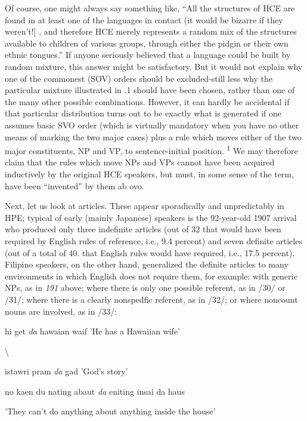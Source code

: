 Of course, one might always say something like, ``All the struc\-tures of HCE are found in at least one of the languages in contact (it would be bizarre if they weren't!] , and therefore HCE merely repre\-sents a random mix of the structures available to children of various groups, through either the pidgin or their own ethnic tongues.'' If anyone seriously believed that a language could be built by random mixture, this answer might be satisfactory. But it would not explain why one of the commonest (SOV) orders should be excluded-still less why the particular mixture illustrated in .1 should have been chosen, rather than one of the many other possible combinations. However, it can hardly be accidental if that particular distribution turns out to be exactly what is generated if one assumes basic SVO order (which is virtually mandatory when you have no other means of mark\-ing the two major cases) plus a rule which moves either of the two major constituents, NP and VP, to sentence-initial position. \textsuperscript{1} We may 
therefore claim that the rules which move NPs and VPs cannot have been acquired inductively by the original HCE speakers, but must, in some sense of the term, have been ``invented'' by them ab ovo.

Next, let us look at articles. These appear sporadically and unpredictably in HPE; typical of early (mainly Japanese) speakers is the 92-year-old 1907 arrival who produced only three indefinite articles (out of 32 that would have been required by English rules of reference, i.e., 9.4 percent) and seven definite articles (out of a total of 40. that English rules would have required, i.e., 17.5 percent). Filipino speakers, on the other hand, generalized the definite articles to many environ\-ments in which English does not require them, for example: with generic NPs, as in \textit{191} above; where there is only one possible refer\-ent, as in /30/ or /31/; where there is a clearly nonspedfic referent, as in /32/; or where noncount nouns are involved, as in /33/:

\ea\label{ex:30}
 hi get \textit{da} hawaian waif 'He has a Hawaiian wife'
\glt
\z

{\textbackslash}


\ea\label{ex:31}
 istawri pram \textit{da} gad 'God's story'
\glt
\z

\ea\label{ex:32}
 no kaen du nating abaut \textit{da} eniting insai da haus
\glt
\z

'They can't do anything about anything inside the house'

